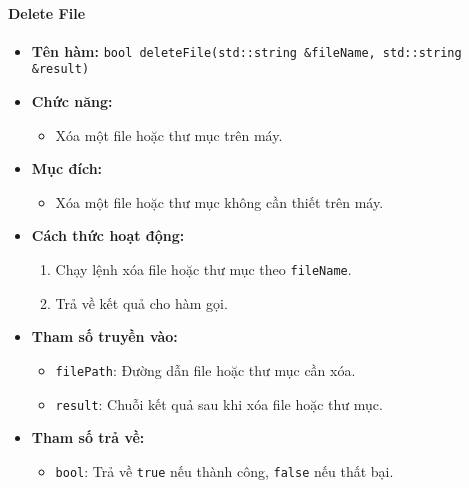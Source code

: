 \paragraph{Delete File}
\begin{itemize}
    \item \textbf{Tên hàm:} \texttt{bool deleteFile(std::string \&fileName, std::string \&result)}
    \item \textbf{Chức năng:}
    \begin{itemize}
        \item Xóa một file hoặc thư mục trên máy.
    \end{itemize}
    \item \textbf{Mục đích:}
    \begin{itemize}
        \item Xóa một file hoặc thư mục không cần thiết trên máy.
    \end{itemize}
    \item \textbf{Cách thức hoạt động:}
    \begin{enumerate}
        \item Chạy lệnh xóa file hoặc thư mục theo \texttt{fileName}.
        \item Trả về kết quả cho hàm gọi.
    \end{enumerate}
    \item \textbf{Tham số truyền vào:}
    \begin{itemize}
        \item \texttt{filePath}: Đường dẫn file hoặc thư mục cần xóa.
        \item \texttt{result}: Chuỗi kết quả sau khi xóa file hoặc thư mục.
    \end{itemize}
    \item \textbf{Tham số trả về:}
    \begin{itemize}
        \item \texttt{bool}: Trả về \texttt{true} nếu thành công, \texttt{false} nếu thất bại.
    \end{itemize}
\end{itemize}


